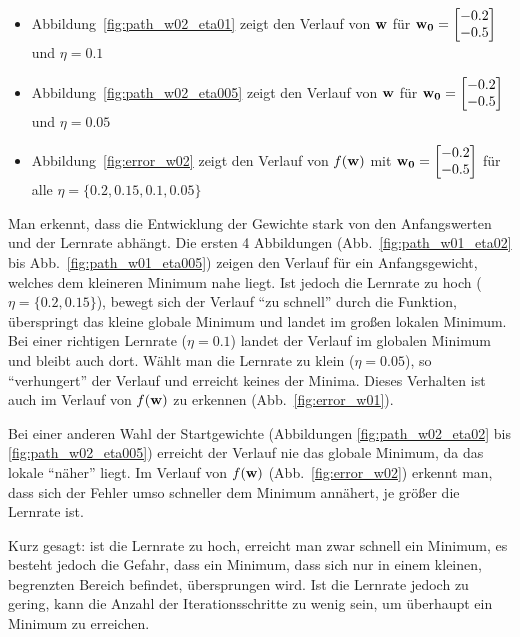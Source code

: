 \begin{itemize}
  \item Abbildung~\ref{fig:path_w02_eta01} zeigt den Verlauf von $\mathbf{w}$ für $\mathbf{w_0} = \begin{bmatrix} -0.2 \\ -0.5 \end{bmatrix}$ und $\eta = 0.1$
  \item Abbildung~\ref{fig:path_w02_eta005} zeigt den Verlauf von $\mathbf{w}$ für $\mathbf{w_0} = \begin{bmatrix} -0.2 \\ -0.5 \end{bmatrix}$ und $\eta = 0.05$
  \item Abbildung~\ref{fig:error_w02} zeigt den Verlauf von $f(\mathbf{w})$ mit $\mathbf{w_0} = \begin{bmatrix} -0.2 \\ -0.5 \end{bmatrix}$ für alle $\eta = \{0.2, 0.15, 0.1, 0.05\}$
\end{itemize}

Man erkennt, dass die Entwicklung der Gewichte stark von den Anfangswerten und der Lernrate abhängt. Die ersten 4 Abbildungen (Abb.~\ref{fig:path_w01_eta02} bis Abb.~\ref{fig:path_w01_eta005}) zeigen den Verlauf für ein Anfangsgewicht, welches dem kleineren Minimum nahe liegt. Ist jedoch die Lernrate zu hoch ($\eta = \{0.2, 0.15\}$), bewegt sich der Verlauf ``zu schnell'' durch die Funktion, überspringt das kleine globale Minimum und landet im großen lokalen Minimum. Bei einer richtigen Lernrate ($\eta = 0.1$) landet der Verlauf im globalen Minimum und bleibt auch dort. Wählt man die Lernrate zu klein ($\eta = 0.05$), so ``verhungert'' der Verlauf und erreicht keines der Minima. Dieses Verhalten ist auch im Verlauf von $f(\mathbf{w})$ zu erkennen (Abb.~\ref{fig:error_w01}).

Bei einer anderen Wahl der Startgewichte (Abbildungen \ref{fig:path_w02_eta02} bis \ref{fig:path_w02_eta005}) erreicht der Verlauf nie das globale Minimum, da das lokale ``näher'' liegt. Im Verlauf von $f(\mathbf{w})$ (Abb.~\ref{fig:error_w02}) erkennt man, dass sich der Fehler umso schneller dem Minimum annähert, je größer die Lernrate ist.

Kurz gesagt: ist die Lernrate zu hoch, erreicht man zwar schnell ein Minimum, es besteht jedoch die Gefahr, dass ein Minimum, dass sich nur in einem kleinen, begrenzten Bereich befindet, übersprungen wird. Ist die Lernrate jedoch zu gering, kann die Anzahl der Iterationsschritte zu wenig sein, um überhaupt ein Minimum zu erreichen.


